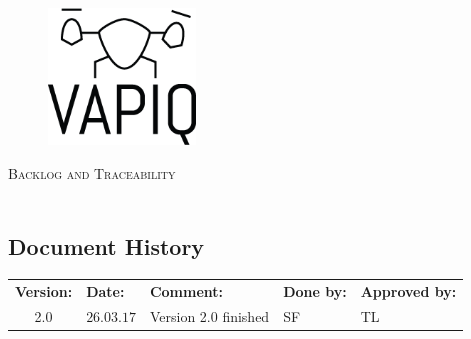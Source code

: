 \documentclass{article}
\author{Aleksander Holthe  \\ Katrine Sundal Haune \\ Kent Kjeldaas \\ Stian Fredriksen \\ Tomas Lyngroth \\ Vanja Katinka Halvorsen}
\makeatletter
\let\vapiqteam\@author
\makeatother
\begin{document}
\begin{titlepage}
    \centering
    \pagecolor{gainsboro}
	\\[3.0 cm]
    \begin{figure}[h]
        \centering
        \includegraphics[width = 0.35\textwidth]{VAPIQ-PICTURES//Logo2_Tilted.png}
        \\[2.0 cm] 
    \end{figure}                              
    \textsc{\Huge Backlog and Traceability}  
    \\[1 cm]
    \textsc{\Large }   
    \\[3.0 cm]
	\large \vapiqteam      
\end{titlepage}
\pagecolor{white}


\begin{center}
\section*{\textbf{Document History}}
\begin{tabular}{cllll}
\rowcolor{cadetgrey}
\textbf{Version:}    &\textbf{Date:} 	 &\textbf{Comment:}    &\textbf{Done by:}   &\textbf{Approved by:}  \\
2.0       & $26.03.17$   & Version 2.0 finished  & SF  & TL \\
\end{tabular}                                                                   
\end{center}
\end{document}
